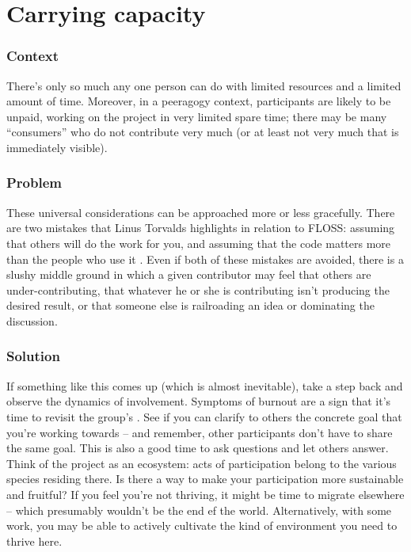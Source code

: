 \begingroup \color{OliveGreen}

\section{Carrying capacity}\label{sec:Carrying_capacity}
\subsubsection*{Context} There's only so much any one person can do with
limited resources and a limited amount of time.  Moreover, in a
peeragogy context, participants are likely to be unpaid, working on
the project in very limited spare time; there may be many
``consumers'' who do not contribute very much (or at least not very much that is immediately visible).

\subsubsection*{Problem} These universal considerations can
be approached more or less gracefully.  There are two mistakes that
Linus Torvalds highlights in relation to FLOSS: assuming that others
will do the work for you, and assuming that the code matters more than
the people who use it \cite{torvalds-interview}.  Even if both of these mistakes are avoided,
there is a slushy middle ground in which a given contributor may feel
that others are under-contributing, that whatever he or she is
contributing isn't producing the desired result, or that someone else
is railroading an idea or dominating the discussion.

\subsubsection*{Solution} If something like this comes up (which is almost inevitable),
take a step back and observe the dynamics of involvement.  Symptoms of
burnout are a sign that it's time to revisit the group's
.  See if you can clarify to others the concrete
goal that you're working towards -- and remember, other participants
don't have to share the same goal.  This is also a good time to ask
questions and let others answer.  Think of the project as an
ecosystem: acts of participation belong to the various species
residing there.  Is there a way to make your participation more
sustainable and fruitful?  If you feel you're not thriving, it might
be time to migrate elsewhere -- which presumably wouldn't be the end
ef the world.  Alternatively, with some work, you may be able to
actively cultivate the kind of environment you need to thrive here.


